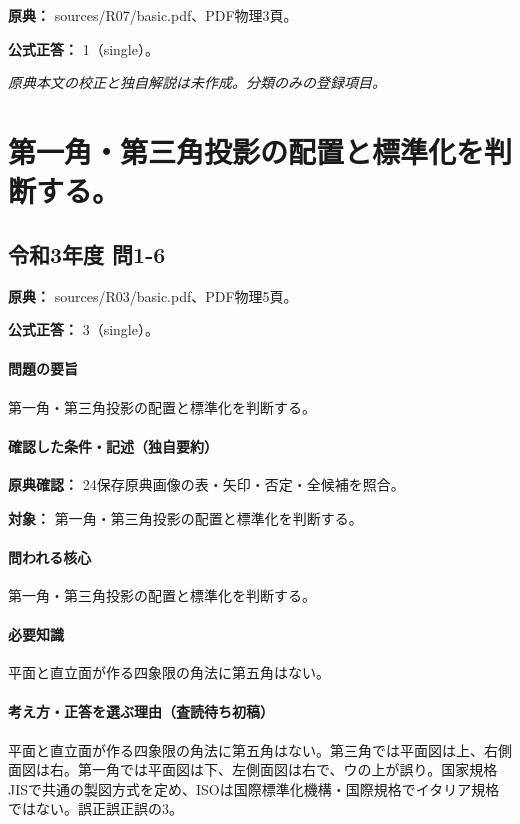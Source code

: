 \noindent\textbf{原典：} sources/R07/basic.pdf、PDF物理3頁。

\textbf{公式正答：} 1（single）。

\par\textit{原典本文の校正と独自解説は未作成。分類のみの登録項目。}

\section{第一角・第三角投影の配置と標準化を判断する。}

\subsection{令和3年度 問1-6}
\label{q:r03-reg-basic-1-6}

\noindent\textbf{原典：} sources/R03/basic.pdf、PDF物理5頁。

\textbf{公式正答：} 3（single）。

\paragraph{問題の要旨} 第一角・第三角投影の配置と標準化を判断する。

\paragraph{確認した条件・記述（独自要約）}\mbox{}\par

\noindent\textbf{原典確認：} 24保存原典画像の表・矢印・否定・全候補を照合。\par

\noindent\textbf{対象：} 第一角・第三角投影の配置と標準化を判断する。\par

\paragraph{問われる核心} 第一角・第三角投影の配置と標準化を判断する。

\paragraph{必要知識} 平面と直立面が作る四象限の角法に第五角はない。

\paragraph{考え方・正答を選ぶ理由（査読待ち初稿）} 平面と直立面が作る四象限の角法に第五角はない。第三角では平面図は上、右側面図は右。第一角では平面図は下、左側面図は右で、ウの上が誤り。国家規格JISで共通の製図方式を定め、ISOは国際標準化機構・国際規格でイタリア規格ではない。誤正誤正誤の3。

